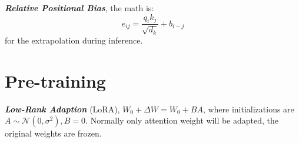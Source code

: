 \documentclass[10pt]{elegantbook}
\newcommand{\mydefination}[1]{\textbf{\textit{\textcolor{structurecolor}{#1}}}}
\begin{document}
\mydefination{Relative Positional Bias}, the math is:
\[ e_{ij} = \frac{q_i k_j}{\sqrt{d_k}} + b_{i-j} \]
for the extrapolation during inference.

\section{Pre-training}

\mydefination{Low-Rank Adaption} (LoRA), $W_0 + \Delta W = W_0 + BA$, where initializations are $A \sim \mathcal N(0, \sigma^2), B=0$. Normally only attention
weight will be adapted, the original weights are frozen.
\end{document}
